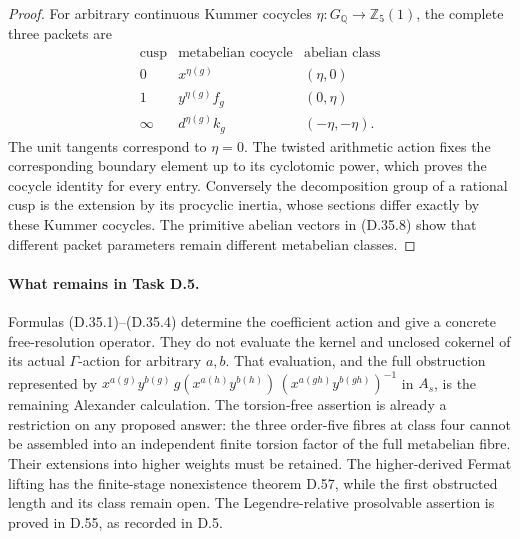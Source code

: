 \begin{proof}
For arbitrary continuous Kummer cocycles
\(\eta:G_{\mathbb Q}\to\mathbb Z_5(1)\),
the complete three packets are
\[
 \begin{array}{c|c|c}
 \text{cusp}&\text{metabelian cocycle}
                         &\text{abelian class}\\\hline
 0&x^{\eta(g)}&(\eta,0)\\
 1&y^{\eta(g)}f_g&(0,\eta)\\
 \infty&d^{\eta(g)}k_g&(-\eta,-\eta).
 \end{array}                                             \tag{D.35.8}
\]
The unit tangents correspond to \(\eta=0\).
The twisted arithmetic action fixes
the corresponding boundary element
up to its cyclotomic power, which
proves the cocycle identity for every
entry. Conversely the decomposition
group of a rational cusp is the
extension by its procyclic inertia,
whose sections differ exactly by
these Kummer cocycles. The primitive
abelian vectors in (D.35.8) show that
different packet parameters remain
different metabelian classes.
\end{proof}

\paragraph{What remains in Task D.5.}
Formulas (D.35.1)--(D.35.4) determine the
coefficient action and give a concrete
free-resolution operator. They do not
evaluate the kernel and unclosed
cokernel of its actual \(\Gamma\)-action
for arbitrary \(a,b\). That evaluation,
and the full obstruction represented
by \(x^{a(g)}y^{b(g)}\,
g(x^{a(h)}y^{b(h)})\,
(x^{a(gh)}y^{b(gh)})^{-1}\) in \(A_s\),
is the remaining Alexander calculation.
The torsion-free assertion is already
a restriction on any proposed answer:
the three order-five fibres at class
four cannot be assembled into an
independent finite torsion factor of
the full metabelian fibre. Their
extensions into higher weights must
be retained. The higher-derived
Fermat lifting has the finite-stage
nonexistence theorem D.57, while the
first obstructed length and its class
remain open. The
Legendre-relative prosolvable assertion
is proved in D.55, as recorded in D.5.

